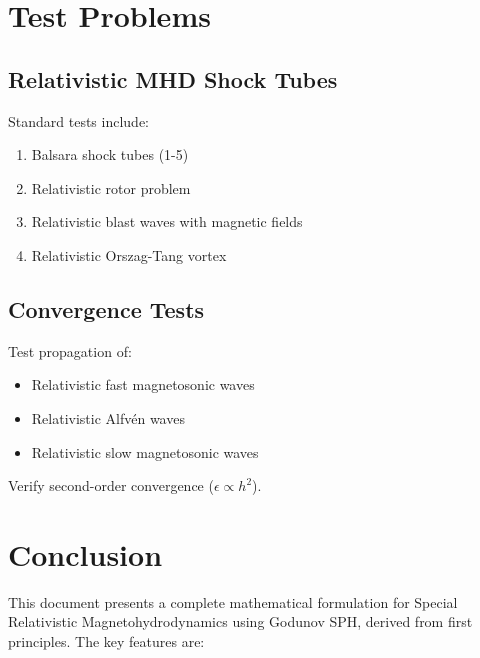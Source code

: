 \documentclass[12pt,a4paper]{article}
\begin{document}
\section{Test Problems}

\subsection{Relativistic MHD Shock Tubes}

Standard tests include:
\begin{enumerate}
    \item Balsara shock tubes (1-5)
    \item Relativistic rotor problem
    \item Relativistic blast waves with magnetic fields
    \item Relativistic Orszag-Tang vortex
\end{enumerate}

\subsection{Convergence Tests}

Test propagation of:
\begin{itemize}
    \item Relativistic fast magnetosonic waves
    \item Relativistic Alfv\'en waves
    \item Relativistic slow magnetosonic waves
\end{itemize}

Verify second-order convergence ($\epsilon \propto h^2$).

\section{Conclusion}

This document presents a complete mathematical formulation for Special Relativistic
Magnetohydrodynamics using Godunov SPH, derived from first principles. The key features are:
\end{document}

